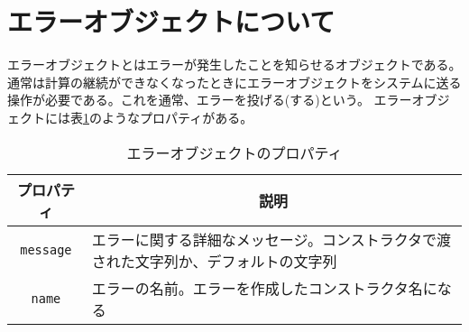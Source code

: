  \section{エラーオブジェクトについて}
エラーオブジェクトとはエラーが発生したことを知らせるオブジェクトである。
通常は計算の継続ができなくなったときにエラーオブジェクトをシステムに送る
操作が必要である。これを通常、エラーを投げる(する)という。
エラーオブジェクトには表\ref{ErrorProp}のようなプロパティがある。
\begin{table}
 \caption{エラーオブジェクトのプロパティ}\label{ErrorProp}
 \begin{center}
	 \begin{tabular}{|c|m{}|}\hline
		プロパティ&\multicolumn{1}{c|}{説明}\\ \hline
		\texttt{message}&エラーに関する詳細なメッセージ。コンストラクタで渡
				された文字列か、デフォルトの文字列\\ \hline
		\texttt{name}&エラーの名前。エラーを作成したコンストラクタ名になる\\ \hline

	\end{tabular}
 \end{center}
\end{table}
